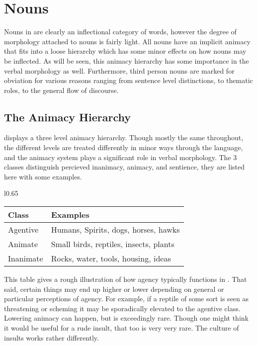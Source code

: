 \section{Nouns}
Nouns in \langname are clearly an inflectional category of words, however the degree of morphology attached to nouns is fairly light. All nouns have an implicit animacy that fits into a loose hierarchy which has some minor effects on how nouns may be inflected. As will be seen, this animacy hierarchy has some importance in the verbal morphology as well. Furthermore, third person nouns are marked for obviation for various reasons ranging from sentence level distinctions, to thematic roles, to the general flow of discourse.

\subsection{The Animacy Hierarchy}
\langname displays a three level animacy hierarchy. Though mostly the same throughout, the different levels are treated differently in minor ways through the language, and the animacy system plays a significant role in verbal morphology. The 3 classes distinguish percieved inanimacy, animacy, and sentience, they are listed here with some examples.
\vertspace
  \begin{wrapfigure}{l}{0.65\textwidth}
    \begin{tabular}{|l|l|}
      \hline
      Class           & Examples                               \\ \hline \hline
      Agentive        & Humans, Spirits, dogs, horses, hawks   \\
      Animate         & Small birds, reptiles, insects, plants \\  %
      Inanimate       & Rocks, water, tools, housing, ideas    \\ \hline
    \end{tabular}
  \end{wrapfigure}
  This table gives a rough illustration of how agency typically functions in \langname. That said, certain things may end up higher or lower depending on general or particular perceptions of agency. For example, if a reptile of some sort is seen as threatening or scheming it may be sporadically elevated to the agentive class. Lowering animacy can happen, but is exceedingly rare. Though one might think it would be useful for a rude insult, that too is very very rare. The culture of insults works rather differently.

